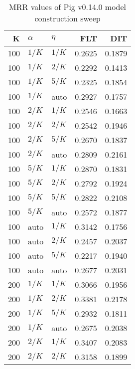
\begin{table}
\begin{spacing}{1.2}
\centering
\caption{MRR values of Pig v0.14.0 model construction sweep}
\label{table:pig_model_sweep}
\vspace{0.2em}
\parbox{.45\linewidth}{\centering \begin{tabular}{rll|rr}
\toprule
   K &  $\alpha$ &    $\eta$ & FLT &       DIT \\
\midrule
 100 &  $1/K$ &  $1/K$ &           0.2625 &       0.1879 \\
 100 &  $1/K$ &  $2/K$ &           0.2292 &       0.1413 \\
 100 &  $1/K$ &  $5/K$ &           0.2325 &       0.1854 \\
 100 &  $1/K$ &   auto &           0.2927 &       0.1757 \\
 100 &  $2/K$ &  $1/K$ &           0.2546 &       0.1663 \\
 100 &  $2/K$ &  $2/K$ &           0.2542 &       0.1946 \\
 100 &  $2/K$ &  $5/K$ &           0.2670 &       0.1837 \\
 100 &  $2/K$ &   auto &           0.2809 &       0.2161 \\
 100 &  $5/K$ &  $1/K$ &           0.2870 &       0.1831 \\
 100 &  $5/K$ &  $2/K$ &           0.2792 &       0.1924 \\
 100 &  $5/K$ &  $5/K$ &           0.2822 &       0.2108 \\
 100 &  $5/K$ &   auto &           0.2572 &       0.1877 \\
 100 &   auto &  $1/K$ &           0.3142 &       0.1756 \\
 100 &   auto &  $2/K$ &           0.2457 &       0.2037 \\
 100 &   auto &  $5/K$ &           0.2217 &       0.1940 \\
 100 &   auto &   auto &           0.2677 &       0.2031 \\
 200 &  $1/K$ &  $1/K$ &           0.3066 &       0.1956 \\
 200 &  $1/K$ &  $2/K$ &           0.3381 &       0.2178 \\
 200 &  $1/K$ &  $5/K$ &           0.2932 &       0.1811 \\
 200 &  $1/K$ &   auto &           0.2675 &       0.2038 \\
 200 &  $2/K$ &  $1/K$ &           0.3407 &       0.2083 \\
 200 &  $2/K$ &  $2/K$ &           0.3158 &       0.1899 \\

\end{tabular}}
\end{spacing}
\end{table}
